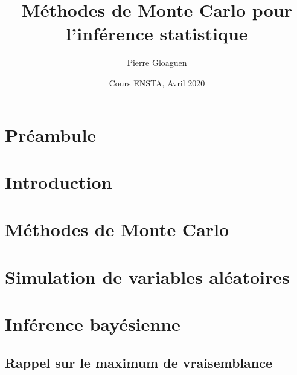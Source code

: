 \documentclass[]{article}
\title{Méthodes de Monte Carlo pour l'inférence statistique}
\author{Pierre Gloaguen}
\date{Cours ENSTA, Avril 2020}
\begin{document}
\maketitle

{
\setcounter{tocdepth}{2}
\tableofcontents
}
\newpage

\hypertarget{pruxe9ambule}{%
\section*{Préambule}\label{pruxe9ambule}}



\newpage

\hypertarget{introduction}{%
\section{Introduction}\label{introduction}}



\newpage

\hypertarget{muxe9thodes-de-monte-carlo}{%
\section{Méthodes de Monte Carlo}\label{muxe9thodes-de-monte-carlo}}



\newpage

\hypertarget{simulation-de-variables-aluxe9atoires}{%
\section{Simulation de variables
aléatoires}\label{simulation-de-variables-aluxe9atoires}}



\newpage

\hypertarget{infuxe9rence-bayuxe9sienne}{%
\section{Inférence bayésienne}\label{infuxe9rence-bayuxe9sienne}}

\hypertarget{rappel-sur-le-maximum-de-vraisemblance}{%
\subsection{Rappel sur le maximum de
vraisemblance}\label{rappel-sur-le-maximum-de-vraisemblance}}
\end{document}
